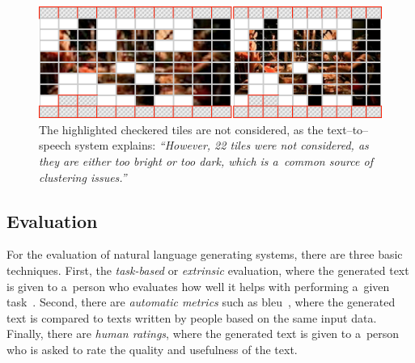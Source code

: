 \begin{figure}[!ht]
  \centering
  \includegraphics[width=0.75\linewidth]{./tile-highlight.png}
  \caption[The highlighted checkered tiles are not considered]{The highlighted checkered tiles are not considered, as the text--to--speech system explains: \textit{``However, 22 tiles were not considered, as they are either too bright or too dark, which is a~common source of clustering issues.''}}
  \label{fig:tile-highlight}
\end{figure}

\subsection{Evaluation}
\label{sec:evaluation}

For the evaluation of natural language generating systems,
there are three basic techniques.
First, the \emph{task-based} or \emph{extrinsic} evaluation,
where the generated text is given to a~person who evaluates
how well it helps with performing a~given task~\cite{portet2009nlg}.
Second, there are \emph{automatic metrics}
such as {\sc bleu}~\cite{papineni2002bleu}, where the generated text
is compared to texts written by people based on the same input data.
Finally, there are \emph{human ratings}, where the generated text
is given to a~person who is asked to rate the quality and usefulness of the text.

